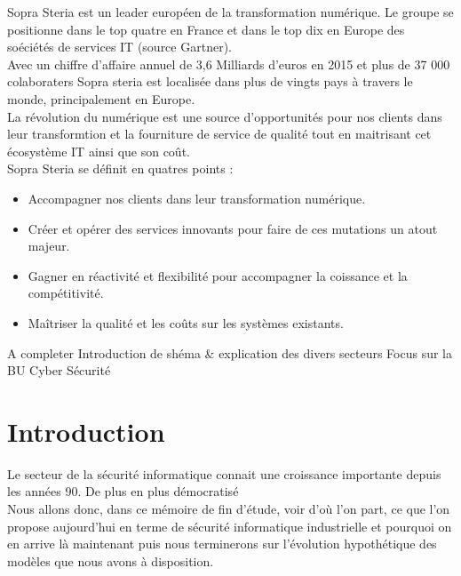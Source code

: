\documentclass[a4paper]{memoir}
\begin{document}
Sopra Steria est un leader européen de la transformation numérique. Le groupe se positionne dans le top quatre en France et dans le top dix en Europe des soéciétés de services IT (source Gartner).\\
Avec un chiffre d'affaire annuel de 3,6 Milliards d'euros en 2015 et plus de 37 000 colaboraters Sopra steria est localisée dans plus de vingts pays à travers le monde, principalement en Europe.\\

La révolution du numérique est une source d'opportunités pour nos clients dans leur transformtion et la fourniture de service de qualité tout en maitrisant cet écosystème IT ainsi que son coût.\\
Sopra Steria se définit en quatres points :

\begin{itemize}
    \item Accompagner nos clients dans leur transformation numérique.
    \item Créer et opérer des services innovants pour faire de ces mutations un atout majeur.
    \item Gagner en réactivité et flexibilité pour accompagner la coissance et la compétitivité.
    \item Maîtriser la qualité et les coûts sur les systèmes existants.
\end{itemize}

A completer
Introduction de shéma \& explication des divers secteurs
Focus sur la BU Cyber Sécurité



\cleardoublepage
\tableofcontents*


\mainmatter%


\chapter*{Introduction}

Le secteur de la sécurité informatique connait une croissance importante depuis les années 90. De plus en plus démocratisé\\

Nous allons donc, dans ce mémoire de fin d'étude, voir d'où l'on part, ce que l'on propose aujourd'hui en terme de sécurité informatique industrielle et pourquoi on en arrive là maintenant puis nous terminerons sur l'évolution hypothétique des modèles que nous avons à disposition.
\end{document}
